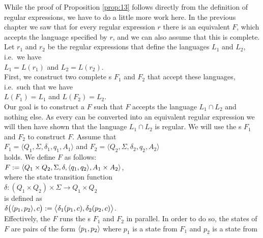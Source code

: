 \proofEng
While the proof of Proposition \ref{prop:13} follows directly from the definition of regular expressions,
we have to do a little more work here. In the previous chapter we saw that for every regular expression
$r$ there is an equivalent  $F$, which accepts the language specified by $r$,
and we can also assume that this  is complete. Let $r_1$ and $r_2$ be the regular expressions that
define the languages $L_1$ and $L_2$, i.e.~we have
\\[0.2cm]
\hspace*{1.3cm}
$L_1 = L(r_1)$ \quad and \quad $L_2 = L(r_2)$.
\\[0.2cm]
First, we construct two complete s
$F_1$ and $F_2$ that accept these languages, i.e.~such that we have
\\[0.2cm]
\hspace*{1.3cm}
$L(F_1) = L_1$ \quad and \quad $L(F_2) = L_2$.
\\[0.2cm]
Our goal is to construct a  $F$ such that $F$ accepts the language
$L_1 \cap L_2$ and nothing else.  As every  can be converted into an equivalent regular
expression we will then have shown that the language
$L_1 \cap L_2$ is regular.  We will use the s $F_1$ and $F_2$ to construct $F$.
Assume that
\\[0.2cm]
\hspace*{1.3cm}
$F_1 = \langle Q_1, \Sigma, \delta_1, q_1, A_1 \rangle$ \quad and \quad
$F_2 = \langle Q_2, \Sigma, \delta_2, q_2, A_2 \rangle$
\\[0.2cm]
holds.  We define $F$ as follows:
\\[0.2cm]
\hspace*{1.3cm}
$F := \langle Q_1 \times Q_2, \Sigma, \delta, \pair(q_1,q_2), A_1 \times A_2 \rangle$,
\\[0.2cm]
where the state transition function 
\\[0.2cm]
\hspace*{1.3cm}
 $\delta: (Q_1 \times Q_2) \times \Sigma \rightarrow Q_1 \times Q_2$ 
\\[0.2cm]
is defined as
\\[0.2cm]
\hspace*{1.3cm}
$\delta\bigl( \pair(p_1, p_2), c \bigr) := \bigl\langle\delta_1(p_1,c), \delta_2(p_2,c)\bigr\rangle$.
\\[0.2cm]
Effectively, the  $F$ runs the s $F_1$ and $F_2$ in parallel.  In order to do so, the
states of $F$ are pairs of the form $\pair(p_1,p_2)$ where $p_1$ is a state from $F_1$ and $p_2$ is a state from
